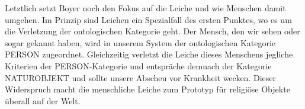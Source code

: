 Letztlich setzt Boyer noch den Fokus auf die Leiche und wie Menschen damit umgehen. Im Prinzip sind Leichen ein Spezialfall des ersten Punktes, wo es um die Verletzung der ontologischen Kategorie geht. Der Mensch, den wir sehen oder sogar gekannt haben, wird in unserem System der ontologischen Kategorie PERSON zugeordnet. Gleichzeitig verletzt die Leiche dieses Menschens jegliche Kriterien der PERSON-Kategorie und entspräche demnach der Kategorie NATUROBJEKT und sollte unsere Abscheu vor Krankheit wecken. Dieser Widerspruch macht die menschliche Leiche zum Prototyp für religiöse Objekte überall auf der Welt.